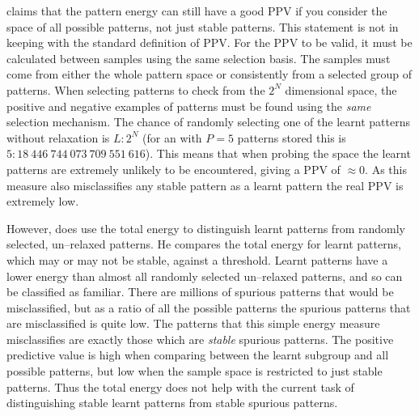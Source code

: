 \citet{Bogacz2001} claims that the pattern energy can still have a good PPV if you consider the space of all possible patterns, not just stable patterns.  This statement is not in keeping with the standard definition of PPV. For the PPV to be valid, it must be calculated between samples using the same selection basis.  The samples must come from either the whole pattern space or consistently from a selected group of patterns. When selecting patterns to check from the \(2^N\) dimensional space, the positive and negative examples of patterns must be found using the \emph{same} selection mechanism.  The chance of randomly selecting one of the learnt patterns without relaxation is $L:2^{N}$ (for an  with $P=5$ patterns stored this is  \(5: 18\ 446\ 744\ 073\ 709\ 551\ 616\)).  This means that when probing the space the learnt patterns are extremely unlikely to be encountered, giving a PPV of $\approx0$.  As this measure also misclassifies any stable pattern as a learnt pattern the real PPV is extremely low.

However, \citeauthor{Bogacz2001} does use the total energy to distinguish learnt patterns from randomly selected, un--relaxed patterns.  He compares the total energy for learnt patterns, which may or may not be stable, against a threshold.  Learnt patterns have a lower energy than almost all randomly selected un--relaxed patterns, and so can be classified as familiar.  There are millions of spurious patterns that would be misclassified, but as a ratio of all the possible patterns the spurious patterns that are misclassified is quite low.  The patterns that this simple energy measure misclassifies are exactly those which are \emph{stable} spurious patterns.  The positive predictive value is high when comparing between the learnt subgroup and all possible patterns, but low when the sample space is restricted to just stable patterns. Thus the total energy does not help with the current task of distinguishing stable learnt patterns from stable spurious patterns.

